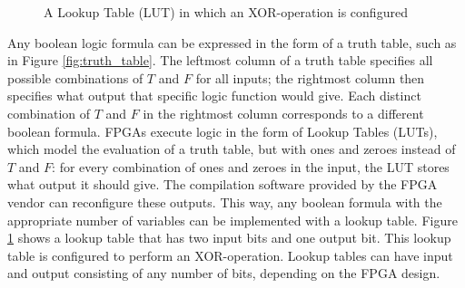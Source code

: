 \begin{figure}
\centering
{}
\caption{A Lookup Table (LUT) in which an XOR-operation is configured}
\label{fig:lookuptable}
\end{figure}

Any boolean logic formula can be expressed in the form of a truth table, such as in Figure \ref{fig:truth_table}. The leftmost column of a truth table specifies all possible combinations of $T$ and $F$ for all inputs; the rightmost column then specifies what output that specific logic function would give. Each distinct combination of $T$ and $F$ in the rightmost column corresponds to a different boolean formula. FPGAs execute logic in the form of Lookup Tables (LUTs), which model the evaluation of a truth table, but with ones and zeroes instead of $T$ and $F$: for every combination of ones and zeroes in the input, the LUT stores what output it should give. The compilation software provided by the FPGA vendor can reconfigure these outputs. This way, any boolean formula with the appropriate number of variables can be implemented with a lookup table. Figure \ref{fig:lookuptable} shows a lookup table that has two input bits and one output bit. This lookup table is configured to perform an XOR-operation. Lookup tables can have input and output consisting of any number of bits, depending on the FPGA design.

